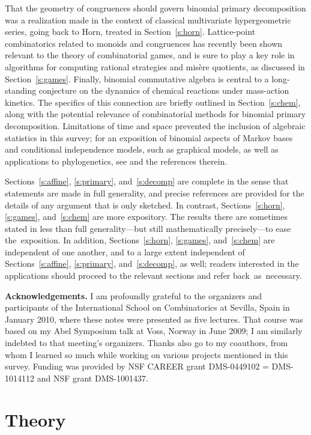 \documentclass[12pt]{amsart}
\numberwithin{equation}{section}
\theoremstyle{definition}
\begin{document}
That the geometry of congruences should govern binomial primary
decomposition was a realization made in the context of classical
multivariate hypergeometric series, going back to Horn, treated in
Section~\ref{s:horn}.  Lattice-point combinatorics related to monoids
and congruences has recently been shown relevant to the theory of
combinatorial games, and is sure to play a key role in algorithms for
computing rational strategies and mis\`ere quotients, as discussed in
Section~\ref{s:games}.  Finally, binomial commutative algebra is
central to a long-standing conjecture on the dynamics of chemical
reactions under mass-action kinetics.  The specifics of this
connection are briefly outlined in Section~\ref{s:chem}, along with
the potential relevance of combinatorial methods for binomial primary
decomposition.  Limitations of time and space prevented the inclusion
of algebraic statistics in this survey; for an exposition of binomial
aspects of Markov bases and conditional independence models, such as
graphical models, as well as applications to phylogenetics, see
\cite{algStat09} and the references therein.

Sections~\ref{s:affine}, \ref{s:primary}, and~\ref{s:decomp} are
complete in the sense that statements are made in full generality, and
precise references are provided for the details of any argument that
is only sketched.  In contrast, Sections~\ref{s:horn}, \ref{s:games},
and~\ref{s:chem} are more expository.  The results there are sometimes
stated in less than full generality---but still mathematically
precisely---to ease the~exposition.  In addition,
Sections~\ref{s:horn}, \ref{s:games}, and~\ref{s:chem} are independent
of one another, and to a large extent independent of
Sections~\ref{s:affine}, \ref{s:primary}, and~\ref{s:decomp}, as well;
readers interested in the applications should proceed to the relevant
sections and refer back~as~necessary.

\medskip
\noindent
\textbf{Acknowledgements.}  I am profoundly grateful to the organizers
and participants of the International School on Combinatorics at
Sevilla, Spain in January 2010, where these notes were presented as
five lectures.  That course was based on my Abel Symposium talk at
Voss, Norway in June 2009; I am similarly indebted to that meeting's
organizers.  Thanks also go to my coauthors, from whom I learned so
much while working on various projects mentioned in this survey.
Funding was provided by NSF CAREER grant DMS-0449102 = DMS-1014112 and
NSF grant DMS-1001437.

\part{Theory}
\end{document}

